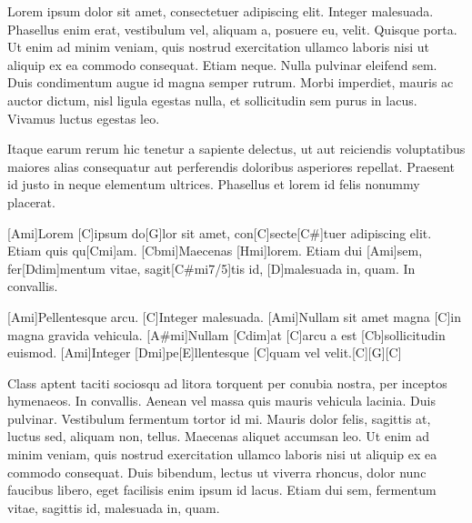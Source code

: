 \documentclass{article}
\begin{document}
Lorem ipsum dolor sit amet, consectetuer adipiscing elit. Integer malesuada.
Phasellus enim erat, vestibulum vel, aliquam a, posuere eu, velit. Quisque porta.
Ut enim ad minim veniam, quis nostrud exercitation ullamco laboris 
nisi ut aliquip ex ea commodo consequat. Etiam neque. Nulla pulvinar eleifend sem. 
Duis condimentum augue id magna semper rutrum. Morbi imperdiet, mauris ac auctor 
dictum, nisl ligula egestas nulla, et sollicitudin sem purus in lacus. Vivamus 
luctus egestas leo.

Itaque earum rerum hic tenetur a sapiente delectus, ut aut reiciendis voluptatibus 
maiores alias consequatur aut perferendis doloribus asperiores repellat. Praesent 
id justo in neque elementum ultrices. Phasellus et lorem id felis nonummy placerat.

\begin{guitar}
\strophe{}[Ami]Lorem [C]ipsum do[G]lor sit amet,
con[C]secte[C#]tuer adipiscing elit.
Etiam quis qu[Cmi]am. [Cbmi]Maecenas [Hmi]lorem.
Etiam dui [Ami]sem, fer[Ddim]mentum vitae,
sagit[C#mi7/5]tis id, [D]malesuada in, quam. In convallis.

[Ami]Pellentesque arcu. [C]Integer malesuada.
[Ami]Nullam sit amet magna [C]in magna gravida vehicula.
[A#mi]Nullam [Cdim]at [C]arcu a est [Cb]sollicitudin euismod.
[Ami]Integer [Dmi]pe[E]llentesque [C]quam vel velit.[C][G][C]
\end{guitar}

Class aptent taciti sociosqu ad litora torquent per conubia nostra, per inceptos 
hymenaeos. In convallis. Aenean vel massa quis mauris vehicula lacinia. Duis 
pulvinar. Vestibulum fermentum tortor id mi. Mauris dolor felis, sagittis at, 
luctus sed, aliquam non, tellus. Maecenas aliquet accumsan leo. Ut enim ad minim 
veniam, quis nostrud exercitation ullamco laboris nisi ut aliquip ex ea commodo 
consequat. Duis bibendum, lectus ut viverra rhoncus, dolor nunc faucibus libero, 
eget facilisis enim ipsum id lacus. Etiam dui sem, fermentum vitae, sagittis id, 
malesuada in, quam. 
\end{document}
